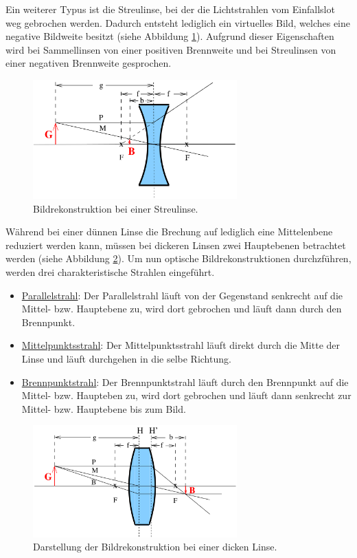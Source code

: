 Ein weiterer Typus ist die Streulinse, bei der die Lichtstrahlen vom Einfallslot
weg gebrochen werden. Dadurch entsteht lediglich ein virtuelles Bild, welches
eine negative Bildweite besitzt (siehe Abbildung \ref{fig:Streulinse}). Aufgrund dieser
Eigenschaften wird bei Sammellinsen von einer positiven Brennweite und bei
Streulinsen von einer negativen Brennweite gesprochen.

\begin{figure}
  \centering
  \includegraphics[width = 0.7\textwidth]{Streulinse.png}
  \caption{Bildrekonstruktion bei einer Streulinse. \cite{anleitung01}}
  \label{fig:Streulinse}
\end{figure}

Während bei einer dünnen Linse die Brechung auf lediglich eine Mittelenbene reduziert
werden kann, müssen bei dickeren Linsen zwei Hauptebenen betrachtet werden (siehe
Abbildung \ref{fig:dickeLinse}). Um nun optische Bildrekonstruktionen durchzführen, werden
drei charakteristische Strahlen eingeführt.

\begin{itemize}
  \item \underline{Parallelstrahl}: Der Parallelstrahl läuft von der Gegenstand
  senkrecht auf die Mittel- bzw. Hauptebene zu, wird dort gebrochen und läuft
  dann durch den Brennpunkt.
  \item \underline{Mittelpunktsstrahl}: Der Mittelpunktsstrahl läuft direkt durch
  die Mitte der Linse und läuft durchgehen in die selbe Richtung.
  \item \underline{Brennpunktstrahl}: Der Brennpunktstrahl läuft durch den Brennpunkt
  auf die Mittel- bzw.  Haupteben zu, wird dort gebrochen und läuft dann senkrecht
  zur Mittel- bzw. Hauptebene bis zum Bild.
\end{itemize}

\begin{figure}
  \centering
  \includegraphics[width = 0.7\textwidth]{dickeLinse.png}
  \caption{Darstellung der Bildrekonstruktion bei einer dicken Linse.\cite{anleitung01}}
  \label{fig:dickeLinse}
\end{figure}

